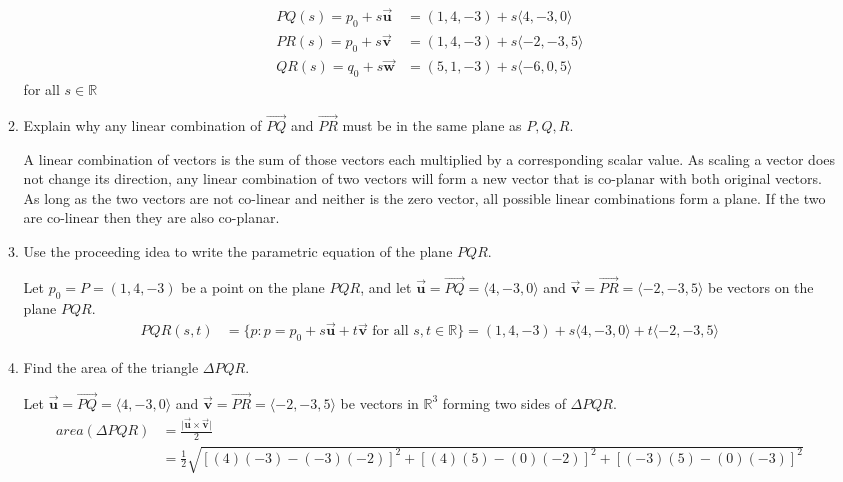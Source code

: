 \documentclass{letter}
\newcommand{\norm}[1]{\lvert #1 \rvert}
\newcommand{\Ve}[1]{\langle #1 \rangle}
\newcommand{\Vn}[1]{\vec{\bm{#1}}}
\newcommand\Que[1]{%
   \leavevmode\noindent
   #1
}
\newcommand\Ans[2][]{%
   \leavevmode\noindent
   {
       \begin{mdframed}[backgroundcolor=blue!10]
       #2
       \end{mdframed}
   }
}
\begin{document}
\begin{enumerate}
\begin{enumerate}[label=(\alph*)]
{    \begin{align*}
    PQ(s) = p_0 + s\Vn{u} 
         &= (1,4,-3) + s\Ve{ 4,-3,0} \\
    PR(s) = p_0 + s\Vn{v} 
         &= (1,4,-3) + s\Ve{ -2,-3,5 } \\
    QR(s) = q_0 + s\Vn{w}
         &= (5,1,-3) + s\Ve{-6,0,5}  
    \end{align*}
    for all $s \in \mathbb{R}$
    }
    \item \Que{Explain why any linear combination of $\overrightarrow{PQ}$ and $\overrightarrow{PR}$ must be in the same plane as $P, Q, R$.}
    \Ans{
    A linear combination of vectors is the sum of those vectors each multiplied by a corresponding scalar value.
    As scaling a vector does not change its direction, any linear combination of two vectors will form a new vector that is co-planar with both original vectors.  As long as the two vectors are not co-linear and neither is the zero vector, all possible linear combinations form a plane. If the two are co-linear then they are also co-planar.  
    }
    \item \Que{Use the proceeding idea to write the parametric equation of the plane $PQR$.} 
    \Ans{
        Let $p_0 = P = (1,4,-3)$ be a point on the plane $PQR$,
        and let $\Vn{u} = \overrightarrow{PQ} = \Ve{ 4, -3, 0 }$ 
        and $\Vn{v} = \overrightarrow{PR} = \Ve{ -2,-3, 5 }$ 
        be vectors on the plane $PQR$.
        \begin{align*}
        PQR(s,t) &= \lbrace p:p=p_0+s\Vn{u}+t\Vn{v} \text{ for all } s,t \in \mathbb{R}\rbrace
        = (1,4,-3) + s\Ve{4,-3,0} + t\Ve{-2,-3,5}
        \end{align*}
    }
    \item \Que{Find the area of the triangle $\Delta PQR$.}
    \Ans{
        Let $\Vn{u} = \overrightarrow{PQ} = \Ve{ 4,-3,0}$ 
        and $\Vn{v} = \overrightarrow{PR} = \Ve{ -2,-3, 5 }$ 
        be vectors in $\mathbb{R}^3$ forming two sides of $\Delta PQR$.
        \begin{align*}
            area(\Delta PQR) &= \frac{\norm{\Vn{u}\times\Vn{v}}}{2}\\
            &= \frac{1}{2}\sqrt{[(4)(-3) - (-3)(-2)]^2+[(4)(5)-(0)(-2)]^2 + [(-3)(5)-(0)(-3)]^2}\\

\end{align*}}
\end{enumerate}
\end{enumerate}
\end{document}
